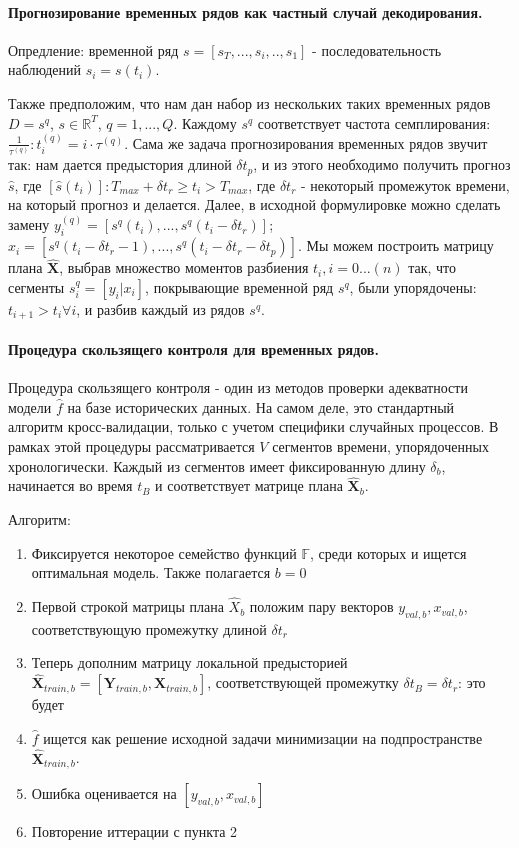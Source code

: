 \documentclass[12pt,twoside]{article}
\begin{document}
\paragraph{Прогнозирование временных рядов как частный случай декодирования.}
Опредление:  временной ряд $s = [s_T, ... , s_i, .. , s_1]$ - последовательность наблюдений $s_i = s(t_i)$. 

Также предположим, что нам дан набор из нескольких таких временных рядов $D = {s^q}$, $s \in \mathbb{R}^T$, $q =1, ..., Q$.
Каждому $s^q$ соответствует частота семплирования:  $\displaystyle \frac{1}{\tau^{(q)}} : t_i^{(q)} = i \cdot  \tau^{(q)}$. Сама же задача прогнозирования временных рядов звучит так: нам дается предыстория длиной $\delta t_p$, и из этого необходимо получить прогноз $\hat{s}$, где $[\hat{s}(t_i)]: T_{max} + \delta t_r \geq  t_i > T_{max}$, где $\delta t_r$ - некоторый промежуток времени, на который прогноз и делается.   Далее, в исходной формулировке можно сделать замену $y_i^{(q)} = [s^q(t_i), ... , s^q(t_i - \delta t_r)]$;
$x_i = [s^q(t_i - \delta t_r - 1), ... , s^q(t_i - \delta t_r - \delta t_p)]$. Мы можем построить матрицу плана $\hat{\mathbf{X}}$, выбрав множество моментов разбиения ${t_i}, i = 0 ... (n) $ так, что сегменты $s_i^q = [y_i| x_i]$, покрывающие временной ряд $s^q$, были упорядочены: $t_{i + 1} > t_i \forall i$, и разбив каждый из рядов ${s^q}$.

\paragraph{Процедура скользящего контроля для временных рядов.}
Процедура скользящего контроля - один из методов проверки адекватности модели $\hat{f}$ на базе исторических данных. На самом деле, это стандартный алгоритм кросс-валидации, только с учетом специфики случайных процессов.
В рамках этой процедуры рассматривается $V$ сегментов времени, упорядоченных хронологически. Каждый из сегментов имеет фиксированную длину $\delta_b$, начинается во время $t_B$ и соответствует матрице плана $\hat{ \mathbf{X}}_b$.

	Алгоритм:
\begin{enumerate}
  \item Фиксируется некоторое семейство функций $\mathbb{F}$, среди которых и ищется оптимальная модель. Также полагается $b = 0$
  \item Первой строкой матрицы плана $\hat{X}_b$ положим пару векторов $y_{val, b}, x_{val, b}$, соответствующую промежутку длиной $\delta t_r$
  \item Теперь дополним матрицу локальной предысторией $\hat{\mathbf{X}}_{train, b} =  [ \mathbf{Y}_{train, b},  \mathbf{X}_{train, b}]$, соответствующей промежутку $\delta t_B = \delta t_r$: это будет 

   \item $\hat{f}$ ищется как решение исходной задачи минимизации на подпространстве $\hat{\mathbf{X}}_{train, b}$.

 \item Ошибка оценивается на $[y_{val, b}, x_{val, b}]$

\item Повторение иттерации с пункта 2
\end{enumerate}
\end{document}
